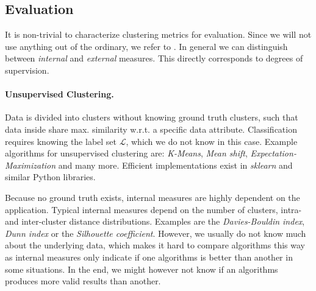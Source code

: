 \subsection{Evaluation}
\label{subsec:eval}
It is non-trivial to characterize clustering metrics for evaluation. Since we will not use anything out of the ordinary, we refer to \cite{aggarwal2015data}. In general we can distinguish between \textit{internal} and \textit{external} measures. This directly corresponds to degrees of supervision. 

\paragraph{Unsupervised Clustering.}
Data is divided into clusters without knowing ground truth clusters, such that data inside share max. similarity w.r.t. a specific data attribute. Classification requires knowing the label set $ \mathcal{L} $, which we do not know in this case. Example algorithms for unsupervised clustering are: \textit{K-Means}, \textit{Mean shift}, \textit{Expectation-Maximization} and many more. Efficient implementations exist in \textit{sklearn} and similar Python libraries.

Because no ground truth exists, internal measures are highly dependent on the application. Typical internal measures depend on the number of clusters, intra- and inter-cluster distance distributions. Examples are the \textit{Davies-Bouldin index}, \textit{Dunn index} or the \textit{Silhouette coefficient}. However, we usually do not know much about the underlying data, which makes it hard to compare algorithms this way as internal measures only indicate if one algorithms is better than another in some situations. In the end, we might however not know if an algorithms produces more valid results than another.

